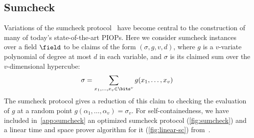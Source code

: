 

\subsection{Sumcheck}
\label{sec:sumcheck}

Variations of the sumcheck protocol~\cite{JACM:LFKN92} have become central to the construction of many of today's state-of-the-art PIOPs. Here we consider sumcheck instances over a field $\field$ to be claims of the form $(\sigma, g, v, d)$, where $g$ is a $v$-variate polynomial of degree at most $d$ in each variable, and $\sigma$ is its claimed sum over the $v$-dimensional hypercube:
\[
 \sigma = \sum_{x_1,\dotsc,x_v \in \bits^v} g(x_1,\dotsc,x_v)
\]
The sumcheck protocol gives a reduction of this claim to checking the evaluation of $g$ at a random point $g(\alpha_1,\dotsc,\alpha_v) = \sigma_v$. For self-containedness, we have included in~\cref{app:sumcheck} an optimized sumcheck protocol (\cref{fig:sumcheck}) and a linear time and space prover algorithm for it (\cref{fig:linear-sc}) from~\cite{BagadDaoDombThaler25}.







